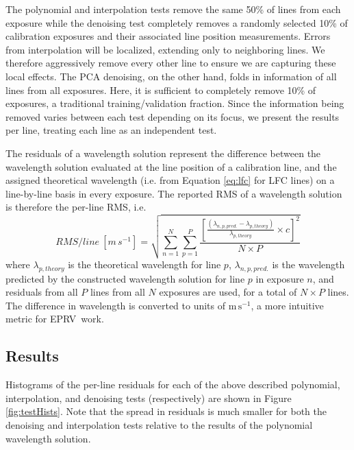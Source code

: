 \documentclass[twocolumn,table,xcolor,trackchanges]{aastex63}
\newcommand{\acronym}[1]{{\small{#1}}}
\newcommand{\eprv}{\acronym{EPRV}}
\newcommand{\mps}{\mathrm{m\,s^{-1}}}
\begin{document}
The polynomial and interpolation tests remove the same 50\% of lines from each exposure while the denoising test completely removes a randomly selected 10\% of calibration exposures and their associated line position measurements.  Errors from interpolation will be localized, extending only to neighboring lines.  We therefore aggressively remove every other line to ensure we are capturing these local effects.  The PCA denoising, on the other hand, folds in information of all lines from all exposures.  Here, it is sufficient to completely remove 10\% of exposures, a traditional training/validation fraction.  Since the information being removed varies between each test depending on its focus, we present the results per line, treating each line as an independent test.

The residuals of a wavelength solution represent the difference between the wavelength solution evaluated at the line position of a calibration line, and the assigned theoretical wavelength (i.e. from Equation \ref{eq:lfc} for LFC lines) on a line-by-line basis in every exposure.  The reported RMS of a wavelength solution is therefore the per-line RMS, i.e.
\begin{equation}
RMS/line \: [m\,s^{-1}] = \sqrt{\sum_{n=1}^N\sum_{p=1}^P\frac{[ \frac{(\lambda_{n,p,pred.} - \lambda_{p,theory})}{\lambda_{p,theory}} \times c ]^2}{N \times P}}
\label{eq:rms}
\end{equation}
where $\lambda_{p,theory}$ is the theoretical wavelength for line $p$, $\lambda_{n,p,pred.}$ is the wavelength predicted by the constructed wavelength solution for line $p$ in exposure $n$, and residuals from all $P$ lines from all $N$ exposures are used, for a total of $N \times P$ lines.  The difference in wavelength is converted to units of $\mps$, a more intuitive metric for \eprv\ work.

\subsection{Results}
Histograms of the per-line residuals for each of the above described polynomial, interpolation, and denoising tests (respectively) are shown in Figure \ref{fig:testHists}.  Note that the spread in residuals is much smaller for both the denoising and interpolation tests relative to the results of the polynomial wavelength solution.
\end{document}
